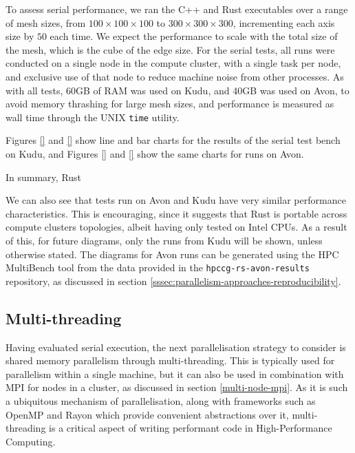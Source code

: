 To assess serial performance, we ran the C++ and Rust executables over a range of mesh sizes, from $100 \times 100 \times 100$ to $300 \times 300 \times 300$, incrementing each axis size by $50$ each time. We expect the performance to scale with the total size of the mesh, which is the cube of the edge size. For the serial tests, all runs were conducted on a single node in the compute cluster, with a single task per node, and exclusive use of that node to reduce machine noise from other processes. As with all tests, 60GB of RAM was used on Kudu, and 40GB was used on Avon, to avoid memory thrashing for large mesh sizes, and performance is measured as wall time through the UNIX \texttt{time} utility.

Figures \ref{} and \ref{} show line and bar charts for the results of the serial test bench on Kudu, and Figures \ref{} and \ref{} show the same charts for runs on Avon.



In summary, Rust 

We can also see that tests run on Avon and Kudu have very similar performance characteristics. This is encouraging, since it suggests that Rust is portable across compute clusters topologies, albeit having only tested on Intel CPUs. As a result of this, for future diagrams, only the runs from Kudu will be shown, unless otherwise stated. The diagrams for Avon runs can be generated using the HPC MultiBench tool from the data provided in the \texttt{hpccg-rs-avon-results} repository, as discussed in section \ref{sssec:parallelism-approaches-reproducibility}.


\subsection{Multi-threading}
\label{ssec:multi-threaded}

Having evaluated serial execution, the next parallelisation strategy to consider is shared memory parallelism through multi-threading. This is typically used for parallelism within a single machine, but it can also be used in combination with MPI for nodes in a cluster, as discussed in section \ref{multi-node-mpi}. As it is such a ubiquitous mechanism of parallelisation, along with frameworks such as OpenMP and Rayon which provide convenient abstractions over it, multi-threading is a critical aspect of writing performant code in High-Performance Computing.

